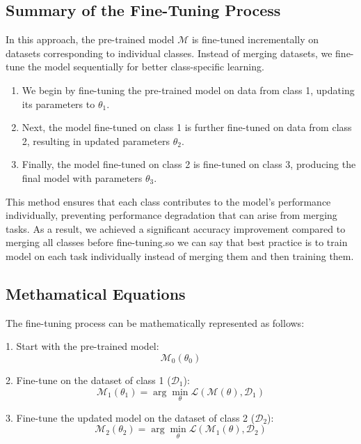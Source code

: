 \documentclass[conference]{IEEEtran}
\begin{document}
\subsection*{Summary of the Fine-Tuning Process}
In this approach, the pre-trained model \( \mathcal{M} \) is fine-tuned incrementally on datasets corresponding to individual classes. Instead of merging datasets, we fine-tune the model sequentially for better class-specific learning.

\begin{enumerate}
    \item We begin by fine-tuning the pre-trained model on data from class 1, updating its parameters to \( \theta_1 \).
    \item Next, the model fine-tuned on class 1 is further fine-tuned on data from class 2, resulting in updated parameters \( \theta_2 \).
    \item Finally, the model fine-tuned on class 2 is fine-tuned on class 3, producing the final model with parameters \( \theta_3 \).
\end{enumerate}

This method ensures that each class contributes to the model's performance individually, preventing performance degradation that can arise from merging tasks. As a result, we achieved a significant accuracy improvement compared to merging all classes before fine-tuning.so we can say that best practice is to train model on each task individually instead of merging them and then training them.

\vspace{1cm}

\subsection{Methamatical Equations}
The fine-tuning process can be mathematically represented as follows:

1. Start with the pre-trained model:
\begin{equation}
\mathcal{M}_0(\theta_0)
\end{equation}

2. Fine-tune on the dataset of class 1 (\( \mathcal{D}_1 \)):
\begin{equation}
\mathcal{M}_1(\theta_1) = \arg \min_{\theta} \mathcal{L}(\mathcal{M}(\theta), \mathcal{D}_1)
\end{equation}

3. Fine-tune the updated model on the dataset of class 2 (\( \mathcal{D}_2 \)):
\begin{equation}
\mathcal{M}_2(\theta_2) = \arg \min_{\theta} \mathcal{L}(\mathcal{M}_1(\theta), \mathcal{D}_2)
\end{equation}
\end{document}

